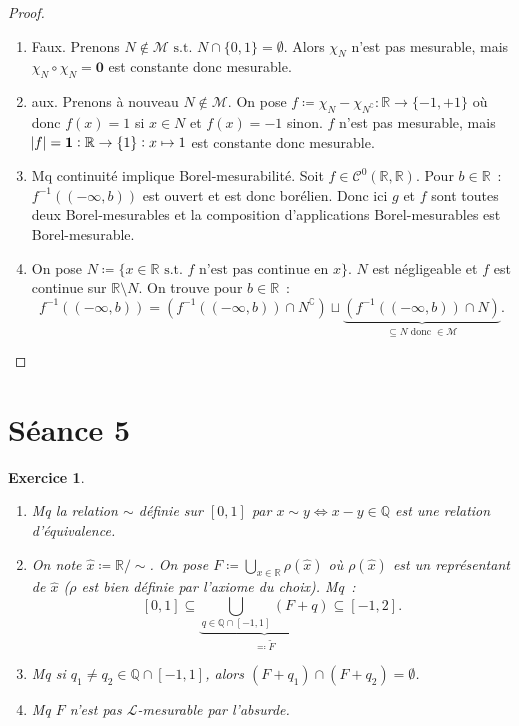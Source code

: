\documentclass{article}
\newtheorem{ex}{Exercice}[section]
\newcommand{\minfty}{{-\infty}}
\newcommand{\st}{\text{ s.t. }}
\newcommand{\C}{\complement}
\newcommand{\Q}{{\mathbb Q}}
\newcommand{\R}{{\mathbb R}}
\begin{document}
\begin{proof}~
\begin{enumerate}
	\item Faux. Prenons $N \not \in \mathcal M \st N \cap \{0, 1\} = \emptyset$. Alors $\chi_N$ n'est pas mesurable, mais $\chi_N \circ \chi_N = \mathbf 0$
	est constante donc mesurable.
	\item aux. Prenons à nouveau $N \not \in \mathcal M$. On pose $f \coloneqq \chi_N - \chi_{N^\C} : \R \to \{-1, +1\}$ où donc $f(x) = 1$ si $x \in N$ et $f(x) = -1$ sinon.
	$f$ n'est pas mesurable, mais $\abs f = \mathbf 1 : \R \to \{1\} : x \mapsto 1$ est constante donc mesurable.
	\item Mq continuité implique Borel-mesurabilité. Soit $f \in \mathcal C^0(\R, \R)$. Pour $b \in \R$~: $f^{-1}((\minfty, b))$ est ouvert et est donc borélien.
	Donc ici $g$ et $f$ sont toutes deux Borel-mesurables et la composition d'applications Borel-mesurables est Borel-mesurable.
	\item On pose $N \coloneqq \{x \in \R \st f \text{ n'est pas continue en } x\}$. $N$ est négligeable et $f$ est continue sur $\R \setminus N$. On trouve pour $b \in \R$~:
	\[f^{-1}((\minfty, b)) = \left(f^{-1}((\minfty, b)) \cap N^\C\right) \sqcup \underbrace {\left(f^{-1}((\minfty, b)) \cap N\right)}_{\subseteq N \text{ donc } \in \mathcal M}.\]
\end{enumerate}
\end{proof}

\newpage
\section{Séance 5}
\begin{ex}
\begin{enumerate}
	\item Mq la relation $\sim$ définie sur $[0, 1]$ par $x \sim y \iff x-y \in \Q$ est une relation d'équivalence.
	\item On note $\hat x \coloneqq \R / \sim$. On pose $F \coloneqq \bigcup_{x \in \R}\rho(\hat x)$ où $\rho(\hat x)$ est un représentant de $\hat x$ ($\rho$ est bien
	définie par l'axiome du choix). Mq~:
	\[[0, 1] \subseteq \underbrace {\bigcup_{q \in \Q \cap [-1, 1]}(F+q)}_{\eqqcolon \tilde F} \subseteq [-1, 2].\]
	\item Mq si $q_1 \neq q_2 \in \Q \cap [-1, 1]$, alors $(F+q_1) \cap (F+q_2) = \emptyset$.
	\item Mq $F$ n'est pas $\mathcal L$-mesurable par l'absurde.
\end{enumerate}
\end{ex}
\end{document}
